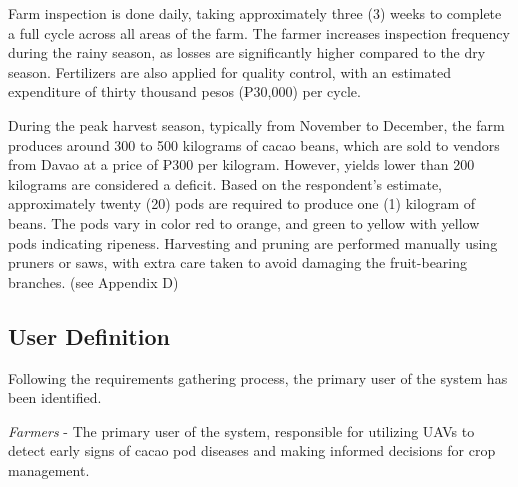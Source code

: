 Farm inspection is done daily, taking approximately three (3) weeks to complete a full cycle across all areas of the farm. The farmer increases inspection frequency during the rainy season, as losses are significantly higher compared to the dry season. Fertilizers are also applied for quality control, with an estimated expenditure of thirty thousand pesos (₱30,000) per cycle.

During the peak harvest season, typically from November to December, the farm produces around 300 to 500 kilograms of cacao beans, which are sold to vendors from Davao at a price of ₱300 per kilogram. However, yields lower than 200 kilograms are considered a deficit. Based on the respondent’s estimate, approximately twenty (20) pods are required to produce one (1) kilogram of beans. The pods vary in color red to orange, and green to yellow with yellow pods indicating ripeness. Harvesting and pruning are performed manually using pruners or saws, with extra care taken to avoid damaging the fruit-bearing branches. (see Appendix D)


\subsection*{User Definition}

Following the requirements gathering process, the primary user of the system has been identified.

\textit{Farmers} - The primary user of the system, responsible for utilizing UAVs to detect early signs of cacao pod diseases and making informed decisions for crop management.

